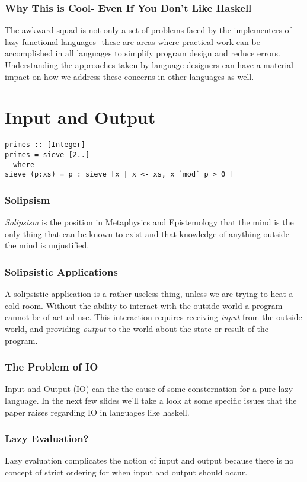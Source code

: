 \documentclass{beamer}
\begin{document}
\begin{frame}
  \frametitle{Why This is Cool- Even If You Don't Like Haskell}
  The awkward squad is not only a set of problems faced by the
  implementers of lazy functional languages- these are areas where
  practical work can be accomplished in all languages to simplify
  program design and reduce errors.  Understanding the approaches
  taken by language designers can have a material impact on how we
  address these concerns in other languages as well.
\end{frame}

\section{Input and Output}
\begin{frame}[fragile]
\begin{center}
\begin{lstlisting}
primes :: [Integer]
primes = sieve [2..]
  where
sieve (p:xs) = p : sieve [x | x <- xs, x `mod` p > 0 ]
\end{lstlisting}
\end{center}
\end{frame}

\begin{frame}
  \frametitle{Solipsism}
  \emph{Solipsism} is the position in Metaphysics and Epistemology
  that the mind is the only thing that can be known to exist and that
  knowledge of anything outside the mind is unjustified.
\end{frame}

\begin{frame}
  \frametitle{Solipsistic Applications}
  A solipsistic application is a rather useless thing, unless we are
  trying to heat a cold room.  Without the ability to interact with
  the outside world a program cannot be of actual use.  This
  interaction requires receiving \emph{input} from the outside world,
  and providing \emph{output} to the world about the state or result
  of the program.
\end{frame}

\begin{frame}
  \frametitle{The Problem of IO}
  Input and Output (IO) can the the cause of some consternation for a
  pure lazy language.  In the next few slides we'll take a look at
  some specific issues that the paper raises regarding IO in languages
  like haskell.
\end{frame}

\begin{frame}
  \frametitle{Lazy Evaluation?}
  Lazy evaluation complicates the notion of input and output because
  there is no concept of strict ordering for when input and output
  should occur.
\end{frame}
\end{document}
